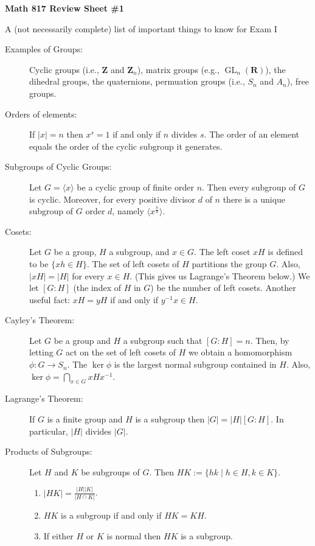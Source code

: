 \documentclass[12pt]{article}
\begin{document}

\centerline{{\bf Math 817 Review Sheet \#1}}
\smallskip
\centerline{{A (not necessarily complete) list of important things to know for Exam I}}

\begin{description}

\item[Examples of Groups:]  Cyclic groups (i.e., $\mathbf Z$ and $\mathbf Z_n$), matrix groups (e.g., $\operatorname{GL}_n(\mathbf R)$), the dihedral groups,
the quaternions, permuation groups (i.e., $S_n$ and $A_n$), free groups.

\item[Orders of elements:] If $|x|=n$ then $x^s=1$ if and only if $n$ divides $s$.  The order of an element equals the order of the cyclic subgroup it generates.

\item[Subgroups of Cyclic Groups:]Let $G=\langle x\rangle$ be a cyclic group of finite order $n$.  Then every subgroup of $G$ is cyclic.  Moreover, for every positive divisor $d$ of $n$ there is a unique subgroup of $G$ order $d$, namely $\langle x^{\frac{n}{d}} \rangle$.

\item[Cosets:]  Let $G$ be a group, $H$ a subgroup, and $x\in G$.  The left coset $xH$ is defined to be $\{xh\in H\}$.   The set of left cosets of $H$ partitions the group $G$.  Also, $|xH|=|H|$ for every $x\in H$.  (This gives us Lagrange's Theorem below.)  We let $[G:H]$ (the index of $H$ in $G$) be the number of left cosets.  Another useful fact: $xH=yH$ if and only if $y^{-1}x\in H$.

\item[Cayley's Theorem:]  Let $G$ be a group and $H$ a subgroup such that $[G:H]=n$.  Then, by letting $G$ act on the set of left cosets of $H$ we obtain a homomorphism $\phi:G\to S_n$.  The $\ker \phi$ is the largest normal subgroup contained in $H$.  Also, $\ker \phi =\bigcap_{x\in G} xHx^{-1}$.

\item[Lagrange's Theorem:]  If $G$ is a finite group and $H$ is a subgroup then $|G|=|H|[G:H]$.  In particular, $|H|$ divides $|G|$.

\item[Products of Subgroups:] Let $H$ and $K$ be subgroups of $G$.  Then ${HK:=\{hk\mid h\in H, k\in K\}}$.   
\begin{enumerate}
\item $|HK|=\frac{|H||K|}{|H\cap K|}$.  
\item $HK$ is a subgroup if and only if $HK=KH$.
\item If either $H$ or $K$ is normal then $HK$ is a subgroup.
\end{enumerate}



\end{description}
\end{document}
